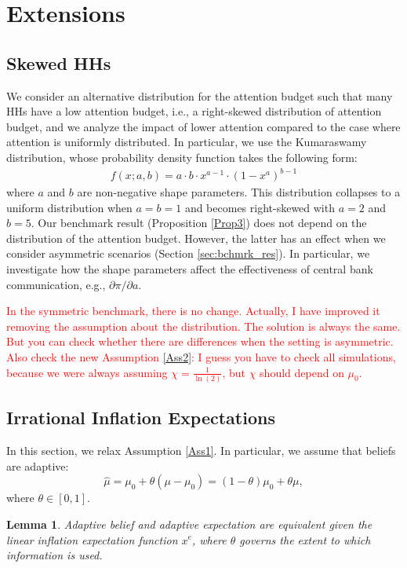 \documentclass[12pt,a4paper]{article}
\newtheorem{lemma}{Lemma}
\begin{document}
\section{Extensions}

\subsection{Skewed HHs}
We consider an alternative distribution for the attention budget such that many HHs have a low attention budget, i.e., a right-skewed distribution of attention budget, and we analyze the impact of lower attention compared to the case where attention is uniformly distributed. In particular, we use the Kumaraswamy distribution, whose probability density function takes the following form:
\begin{align}
    f(x;a,b) = a \cdot b \cdot x^{a-1} \cdot (1-x^a)^{b-1}
\end{align}
where $a$ and $b$ are non-negative shape parameters. This distribution collapses to a uniform distribution when $a=b=1$ and becomes right-skewed with $a=2$ and $b=5$. Our benchmark result (Proposition \ref{Prop3}) does not depend on the distribution of the attention budget. However, the latter has an effect when we consider asymmetric scenarios (Section \ref{sec:bchmrk_res}). In particular, we investigate how the shape parameters affect the effectiveness of central bank communication, e.g., $\partial \pi/ \partial a$.

\textcolor{red}{In the symmetric benchmark, there is no change. Actually, I have improved it removing the assumption about the distribution. The solution is always the same. But you can check whether there are differences when the setting is asymmetric. Also check the new Assumption \ref{Ass2}: I guess you have to check all simulations, because we were always assuming $\chi=\frac{1}{\ln(2)}$, but $\chi$ should depend on $\mu_0$.}

\subsection{Irrational Inflation Expectations}
In this section, we relax Assumption \ref{Ass1}. In particular, we assume that beliefs are adaptive: 
$$\hat{\mu} = \mu_0 + \theta (\mu-\mu_0) = (1-\theta)\mu_0 + \theta \mu,$$
where $\theta\in[0,1]$.
\begin{lemma}
\label{adaptive}
    Adaptive belief and adaptive expectation are equivalent given the linear inflation expectation function $x^e$, where $\theta$ governs the extent to which information is used.
\end{lemma}
\end{document}
